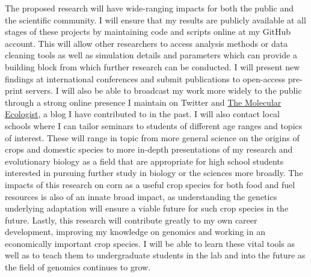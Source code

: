 The proposed research will have wide-ranging impacts for both the public and the scientific community. I will ensure that my results are publicly available at all stages of these projects by maintaining code and scripts online at my GitHub account. This will allow other researchers to access analysis methods or data cleaning tools as well as simulation details and parameters which can provide a building block from which further research can be conducted. I will present new findings at international conferences and submit publications to open-access pre-print servers. I will also be able to broadcast my work more widely to the public through a strong online presence I maintain on Twitter and \href{http://www.molecularecologist.com/}{The Molecular Ecologist}, a blog I have contributed to in the past. I will also contact local schools where I can tailor seminars to students of different age ranges and topics of interest. These will range in topic from more general science on the origins of crops and domestic species to more in-depth presentations of my research and evolutionary biology as a field that are appropriate for high school students interested in pursuing further study in biology or the sciences more broadly.
 The impacts of this research on corn as a useful crop species for both food and fuel resources is also of an innate broad impact, as understanding the genetics underlying adaptation will ensure a viable future for such crop species in the future. Lastly, this research will contribute greatly to my own career development, improving my knowledge on genomics and working in an economically important crop species. I will be able to learn these vital tools as well as to teach them to undergraduate students in the lab and into the future as the field of genomics continues to grow.








